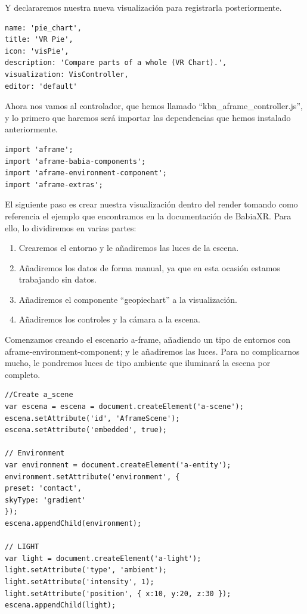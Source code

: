\documentclass[a4paper, 12pt]{book}
\begin{document}
Y declararemos nuestra nueva visualización para registrarla posteriormente.

\begin{lstlisting}[frame=single]
name: 'pie_chart',
title: 'VR Pie',
icon: 'visPie',
description: 'Compare parts of a whole (VR Chart).',
visualization: VisController,
editor: 'default'
\end{lstlisting}

Ahora nos vamos al controlador, que hemos llamado “kbn\_aframe\_controller.js”, y lo primero que haremos será importar las dependencias que hemos instalado anteriormente.

\begin{lstlisting}[frame=single]
import 'aframe';
import 'aframe-babia-components';
import 'aframe-environment-component';
import 'aframe-extras';
\end{lstlisting}

El siguiente paso es crear nuestra visualización dentro del render tomando como referencia el ejemplo que encontramos en la documentación de BabiaXR. Para ello, lo dividiremos en varias partes:

\begin{enumerate}
    \item Crearemos el entorno y le añadiremos las luces de la escena.
    \item Añadiremos los datos de forma manual, ya que en esta ocasión estamos trabajando sin datos.
    \item Añadiremos el componente “geopiechart” a la visualización.
    \item Añadiremos los controles y la cámara a la escena. 
\end{enumerate}

Comenzamos creando el escenario a-frame, añadiendo un tipo de entornos con aframe-environment-component; y le añadiremos las luces. Para no complicarnos mucho, le pondremos luces de tipo ambiente que iluminará la escena por completo.

\begin{lstlisting}[frame=single]
//Create a_scene
var escena = escena = document.createElement('a-scene');
escena.setAttribute('id', 'AframeScene');
escena.setAttribute('embedded', true);

// Environment
var environment = document.createElement('a-entity');
environment.setAttribute('environment', {
preset: 'contact',
skyType: 'gradient'
});
escena.appendChild(environment);

// LIGHT
var light = document.createElement('a-light');
light.setAttribute('type', 'ambient');
light.setAttribute('intensity', 1);
light.setAttribute('position', { x:10, y:20, z:30 });
escena.appendChild(light);
\end{lstlisting}
\end{document}
